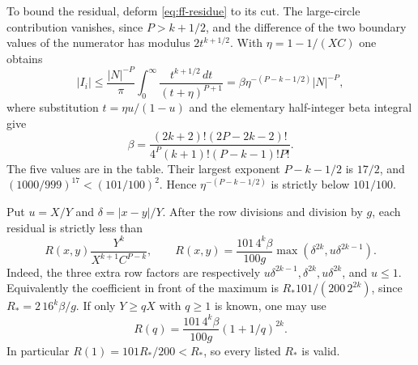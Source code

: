 \documentclass[12pt]{article}
\numberwithin{equation}{section}
\begin{document}
To bound the residual, deform \eqref{eq:ff-residue} to its cut.
The large-circle contribution vanishes, since $P>k+1/2$, and the
difference of the two boundary values of the numerator has modulus
$2t^{k+1/2}$.
With $\eta=1-1/(XC)$ one obtains
\[
 |I_i|\le \frac{|N|^{-P}}\pi
       \int_0^\infty\frac{t^{k+1/2}\,dt}{(t+\eta)^{P+1}}
 =\beta\eta^{-(P-k-1/2)}|N|^{-P},
\]
where substitution $t=\eta u/(1-u)$ and the elementary half-integer
beta integral give
\begin{equation*}
 \beta=\frac{(2k+2)!(2P-2k-2)!}
 {4^P(k+1)!(P-k-1)!P!}.
\end{equation*}
The five values are in the table. Their largest exponent
$P-k-1/2$ is $17/2$, and
$(1000/999)^{17}<(101/100)^2$. Hence $\eta^{-(P-k-1/2)}$ is
strictly below $101/100$.

Put $u=X/Y$ and $\delta=|x-y|/Y$. After the row divisions and division
by $g$, each residual is strictly less than
\begin{equation}\label{eq:ff-point-residual}
 R(x,y)\frac{Y^k}{X^{k+1}C^{P-k}},\qquad
 R(x,y)=\frac{101\,4^k\beta}{100g}
             \max(\delta^{2k},u\delta^{2k-1}).
\end{equation}
Indeed, the three extra row factors are respectively
$u\delta^{2k-1},\delta^{2k},u\delta^{2k}$, and $u\le1$.
Equivalently the coefficient in front of the maximum is
$R_*101/(200\,2^{2k})$, since $R_*=2\,16^k\beta/g$.
If only $Y\ge qX$ with $q\ge1$ is known, one may use
\begin{equation}\label{eq:ff-ratio-residual}
 R(q)=\frac{101\,4^k\beta}{100g}(1+1/q)^{2k}.
\end{equation}
In particular $R(1)=101R_*/200<R_*$, so every listed $R_*$ is valid.
\end{document}
